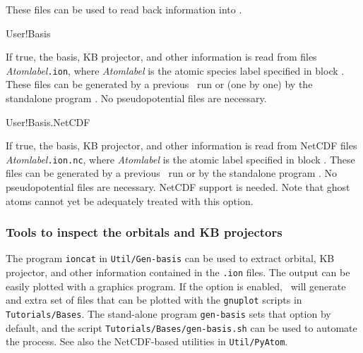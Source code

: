 These files can be used to read back information into \siesta.

\begin{fdflogicalF}{User!Basis}

  If true, the basis, KB projector, and other information is read from
  files \textit{Atomlabel}\texttt{.ion}, where \textit{Atomlabel} is
  the atomic species label specified in block
  . These files can be generated by a
  previous \siesta\ run or (one by one) by the standalone program
  . No pseudopotential files are necessary.

\end{fdflogicalF}

\begin{fdflogicalF}{User!Basis.NetCDF}

  If true, the basis, KB projector, and other information is read from
  NetCDF files \textit{Atomlabel}\texttt{.ion.nc}, where
  \textit{Atomlabel} is the atomic label specified in block
  . These files can be generated by a
  previous \siesta\ run or by the standalone program
  . No pseudopotential files are necessary. NetCDF support
  is needed. Note that ghost atoms cannot yet be adequately treated
  with this option.
  
\end{fdflogicalF}



\subsubsection{Tools to inspect the orbitals and KB projectors}

The program \texttt{ioncat} in \texttt{Util/Gen-basis} can be used to
extract orbital, KB projector, and other information contained in the
\texttt{.ion} files. The output can be easily plotted with a graphics
program.  If the option  is enabled, \siesta\ 
will generate and extra set of files that can be plotted
with the \texttt{gnuplot} scripts in \texttt{Tutorials/Bases}.
The stand-alone program \texttt{gen-basis} sets that option by default, and
the script \texttt{Tutorials/Bases/gen-basis.sh} can be used to automate
the process. See also the NetCDF-based utilities in \texttt{Util/PyAtom}.

